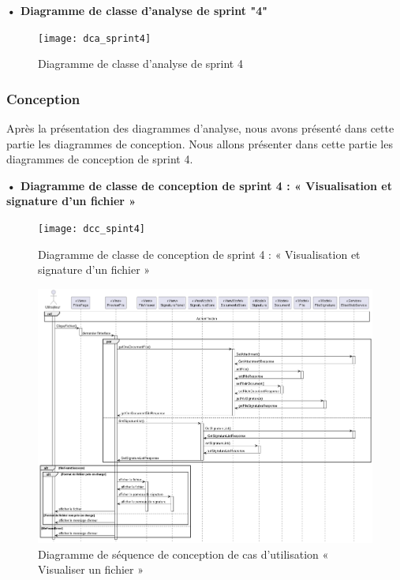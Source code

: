 \textbf{•	Diagramme de classe d'analyse de sprint "4" }

\begin{figure}[H]
  \centering
  \texttt{[image: dca\_sprint4]}
  \caption{Diagramme de classe d'analyse de sprint 4}
  \label{fig:class_analyse_4}
\end{figure}



\subsubsection{Conception}

Après la présentation des diagrammes d'analyse, nous avons présenté dans cette partie les diagrammes de conception.
Nous allons présenter dans cette partie les diagrammes de conception de sprint 4.
\newpage 
\begin{landscape}

\textbf{•	Diagramme de classe de conception de sprint 4 : « Visualisation et signature d'un fichier »}

\begin{figure}[H]
  \centering
  \texttt{[image: dcc\_spint4]}
  \caption{Diagramme de classe de conception de sprint 4 : « Visualisation et signature d'un fichier »}
  \label{fig:class_diagram_4}
\end{figure}
\end{landscape}
\newpage


\begin{figure}[H]
  \centering
  \includegraphics[width=1\textwidth]{out/diagrams/sprint4/sequence_view_file/sequence_view_file}
  \caption{Diagramme de séquence de conception de cas d'utilisation « Visualiser un fichier »}
  \label{fig:sequence_conception_view_file}
\end{figure}

